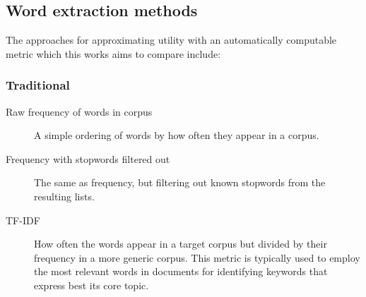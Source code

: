 \subsection{Word extraction methods}
The approaches for approximating utility with an automatically computable metric which this works aims to compare include:
\subsubsection{Traditional}
\begin{description}
	\item [Raw frequency of words in corpus]
	      A simple ordering of words by how often they appear in a corpus.
		\item[Frequency with stopwords filtered out]
			The same as frequency, but filtering out known stopwords from the resulting lists.
	\item [TF-IDF]
	      How often the words appear in a target corpus but divided by their frequency in a more generic corpus.
	      This metric is typically used to employ the most relevant words in documents for identifying keywords that express best its core topic.
\end{description}
